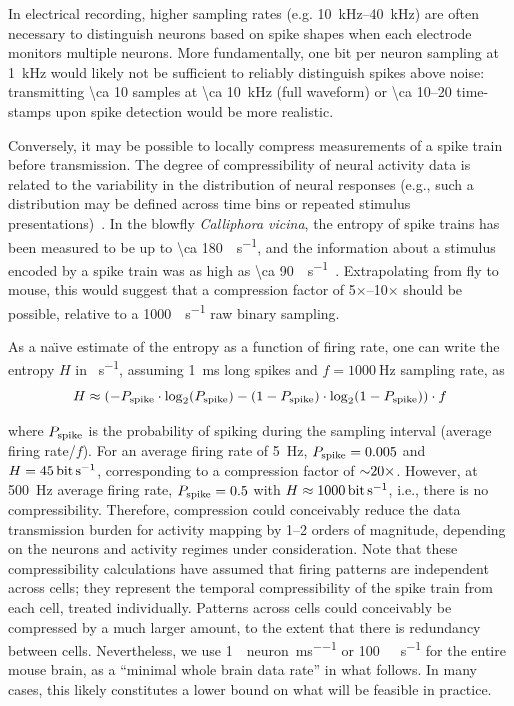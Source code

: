 In electrical recording, higher sampling rates (e.g. \SIrange{10}{40}{\kilo\hertz}) are often necessary to distinguish neurons based on spike shapes when each electrode monitors multiple neurons.
More fundamentally, one bit per neuron sampling at \SI{1}{\kilo\hertz} would likely not be sufficient to reliably distinguish spikes above noise: transmitting \SI{\ca 10}{\bit} samples at \SI{\ca 10}{\kilo\hertz} (full waveform) or \SIrange{\ca 10}{20}{\bit} time-stamps upon spike detection would be more realistic.

Conversely, it may be possible to locally compress measurements of a spike train before transmission.
The degree of compressibility of neural activity data is related to the variability in the distribution of neural responses (e.g., such a distribution may be defined across time bins or repeated stimulus presentations)~\cite{strong98}.
In the blowfly \textit{Calliphora vicina}, the entropy of spike trains has been measured to be up to \SI{\ca 180}{\bit\per\second}, and the information about a stimulus encoded by a spike train was as high as \SI{\ca 90}{\bit\per\second}~\cite{strong98}. Extrapolating from fly to mouse, this would suggest that a compression factor of 5$\times$--10$\times$ should be possible, relative to a \SI{1000}{\bit\per\second} raw binary sampling. 

As a na\"{\i}ve estimate of the entropy as a function of firing rate, one can write the entropy $H$ in \si{\bit\per\second}, assuming \SI{1}{\milli\second} long spikes and $f=\SI{1000}{\hertz}$ sampling rate, as
\[H \approx \left(-P_{\text{\scriptsize spike}}\cdot\log_2\!\left(P_{\text{\scriptsize spike}}\right) - \left(1 - P_{\text{\scriptsize spike}}\right)\cdot\log_2\!\left(1 - P_{\text{\scriptsize spike}}\right)\right) \cdot f\]

where $P_{\text{\scriptsize spike}}$ is the probability of spiking during the sampling interval (average firing rate/$f$).
For an average firing rate of \SI{5}{\hertz}, $P_{\text{\scriptsize spike}}=0.005$ and $H=\SI{45}{\bit\per\second}$, corresponding to a compression factor of ${\sim} 20\times$.
However, at \SI{500}{\hertz} average firing rate, $P_{\text{\scriptsize spike}}=0.5$ with $H\approx\SI{1000}{\bit\per\second}$, i.e., there is no compressibility. 
Therefore, compression could conceivably reduce the data transmission burden for activity mapping by 1--2 orders of magnitude, depending on the neurons and activity regimes under consideration. Note that these compressibility calculations have assumed that firing patterns are independent across cells; they represent the temporal compressibility of the spike train from each cell, treated individually. Patterns across cells could conceivably be compressed by a much larger amount, to the extent that there is redundancy between cells. Nevertheless, we use \SI{1}{\bit\per neuron\per\milli\second} or \SI{100}{\giga\bit\per\second} for the entire mouse brain, as a ``minimal whole brain data rate'' in what follows.
In many cases, this likely constitutes a lower bound on what will be feasible in practice.

